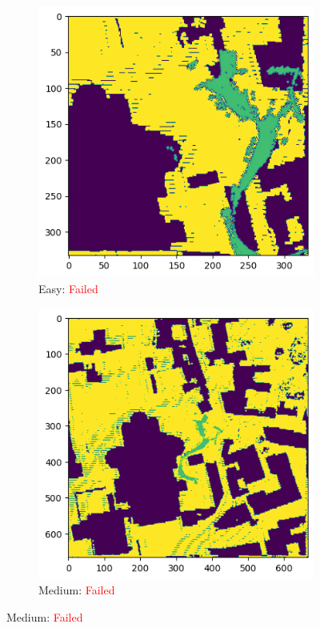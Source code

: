 \documentclass[11pt]{article}
\begin{document}
    \newpage
    \begin{figure}[p]
        \centering
        \begin{subfigure}{0.45\textwidth}
            \centering
            \includegraphics[width=\linewidth]{images/full/easy/5_2_3_easy}
            \caption{Easy: \textcolor{red}{Failed}}
            \label{fig:5_2_3_easy}
        \end{subfigure}
        \hfill
        \begin{subfigure}{0.45\textwidth}
            \centering
            \includegraphics[width=\linewidth]{images/full/medium/5_2_3_medium}
            \caption{Medium: \textcolor{red}{Failed}}
            \label{fig:5_2_4_medium}
        \end{subfigure}


\end{figure}
\end{document}
